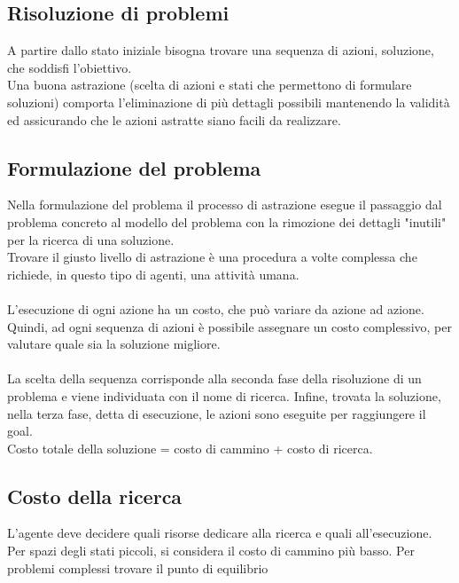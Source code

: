 \documentclass[../main.tex]{subfiles}
\begin{document}
	\subsection{Risoluzione di problemi}
	A partire dallo stato iniziale bisogna trovare una sequenza di azioni, soluzione, che soddisfi l'obiettivo.\\
	Una buona astrazione (scelta di azioni e stati che permettono di formulare soluzioni) comporta l'eliminazione di più dettagli possibili mantenendo la validità ed assicurando che le azioni astratte siano facili da realizzare.
	\subsection{Formulazione del problema}
	Nella formulazione del problema il processo di astrazione esegue il passaggio dal problema concreto al modello del problema con la rimozione dei dettagli "inutili" per la ricerca di una soluzione.\\
	Trovare il giusto livello di astrazione è una procedura a volte complessa che richiede, in questo tipo di agenti, una attività umana.\\ \\
	L’esecuzione di ogni azione ha un costo, che può variare da azione ad azione. Quindi, ad ogni sequenza di azioni è possibile assegnare un costo complessivo, per valutare quale sia la soluzione migliore.\\ \\
	La scelta della sequenza corrisponde alla seconda fase della risoluzione di un problema e viene individuata con il nome di ricerca. Infine, trovata la soluzione, nella terza fase, detta di esecuzione, le azioni sono eseguite per raggiungere il goal.\\
	Costo totale della soluzione = costo di cammino + costo di ricerca.
	\subsection{Costo della ricerca}
	L’agente deve decidere quali risorse dedicare alla ricerca e quali all’esecuzione.\\
	Per spazi degli stati piccoli, si considera il costo di cammino più basso. Per problemi complessi trovare il punto di equilibrio
\end{document}
